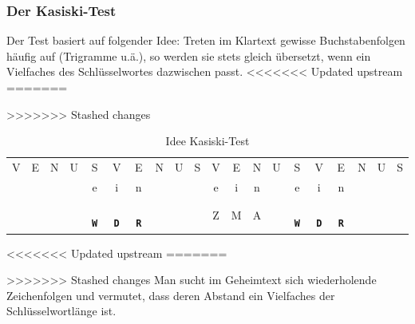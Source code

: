 \documentclass[%
<<<<<<< Updated upstream
11pt,%
twoside,%
titlepage,%
german,%
headsepline%
]{scrartcl}
\newcommand{\spaltenheight}{\rule{0mm}{3ex}}
\newcommand{\spaltensep}{\\[1ex]}
\begin{document}
\subsubsection{Der Kasiski-Test}

Der Test basiert auf folgender Idee:
Treten im Klartext gewisse Buchstabenfolgen häufig auf (Trigramme u.ä.), so werden sie stets gleich übersetzt, wenn ein Vielfaches des Schlüsselwortes dazwischen passt.
<<<<<<< Updated upstream
=======

>>>>>>> Stashed changes
\begin{table}
\begin{tabular}{cccccccccccccccccccc}
\spaltenheight V& E& N& U& S& V& E& N& U& S& V& E& N& U& S& V& E& N& U& S \spaltensep
\spaltenheight & & & & e& i& n& & & & e& i& n& & e& i& n& & &\spaltensep
\spaltenheight & & & & \textbf{\texttt{ W}}& \textbf{\texttt{ D}}& \textbf{\texttt{ R}}& & & & Z& M& A& & \textbf{\texttt{ W}}& \textbf{\texttt{ D}}& \textbf{\texttt{ R}}& & &\spaltensep
\end{tabular}
\caption{Idee Kasiski-Test}
\end{table}
<<<<<<< Updated upstream
=======

>>>>>>> Stashed changes
Man sucht im Geheimtext sich wiederholende Zeichenfolgen und vermutet, dass
deren Abstand ein Vielfaches der Schlüsselwortlänge ist.
\end{document}
